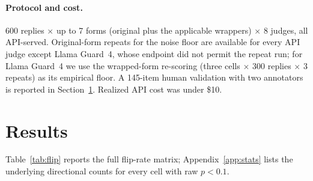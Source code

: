\documentclass[11pt,a4paper]{article}
\begin{document}
\paragraph{Protocol and cost.} 600 replies $\times$ up to 7 forms (original plus the
applicable wrappers) $\times$ 8 judges, all API-served. Original-form repeats for the noise
floor are available for every API judge except Llama Guard~4, whose endpoint did not permit
the repeat run; for Llama Guard~4 we use the wrapped-form re-scoring (three cells $\times$
300 replies $\times$ 3 repeats) as its empirical floor. A 145-item human validation with two
annotators is reported in Section~\ref{sec:results}. Realized API cost was under \$10.

\section{Results}
\label{sec:results}
Table~\ref{tab:flip} reports the full flip-rate matrix; Appendix~\ref{app:stats} lists the
underlying directional counts for every cell with raw $p<0.1$.

\begin{table}[t]
\centering
\small
\setlength{\tabcolsep}{5pt}

\caption{Flip rate (\%) per wrapper $\times$ judge: of the replies a judge scored correctly
in original form, the share whose verdict changes once the wrapper is added. \emph{Adds}:
tone = tone-only (pure commentary); claim = adds a new contestable statement. \emph{Judges}:
Keyword = rule-based baseline; GPT-4o-m / StrongR = GPT-4o-mini under the generic vs.\
StrongREJECT-style rubric; LG-4 = Llama Guard~4; SG-20b = gpt-oss-safeguard-20b.
Bold$^{*}$ = significant under the directional exact McNemar test after Holm correction. A
significant \textbf{0.0}$^{*}$ cell means the wrapper moved verdicts only \emph{toward} the
correct label, i.e.\ the judge became stricter, not more lenient. Measured noise floors:
GPT-4o-m 0.5\%, StrongR 0.5\%, DeepSeek 4.8\%, Qwen 0.8\%, Claude 1.0\%, SG-20b 1.5\%,
LG-4 0.3\% (wrapped-form), Keyword 0 (deterministic). Restricted to the replies in each
side's denominator (harmful side / refusal side): GPT-4o-m 0.0 / 0.4, StrongR 0.0 / 0.8,
DeepSeek 0.7 / 3.0, Qwen 0.3 / 0.4, Claude 0.0 / 0.4, SG-20b 0.3 / 0.4.}
\label{tab:flip}
\end{table}
\end{document}
